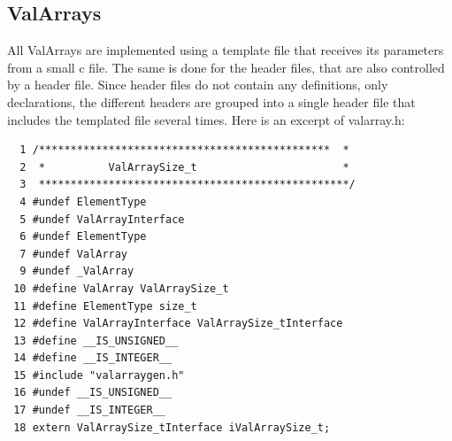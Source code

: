 \documentclass[12pt,a4paper,openany]{memoir} %
\begin{document}
{{\subsection{ValArrays}
All ValArrays are implemented using a template file that receives its parameters from a small c file. The same is done for the header files, that
are also controlled by a header file. Since header files do not contain any definitions, only declarations, the different headers are grouped into
a single header file that includes the templated file several times. Here is an excerpt of valarray.h:
\begin{verbatim}
  1 /**********************************************  *       
  2  *          ValArraySize_t                       *
  3  *************************************************/ 
  4 #undef ElementType
  5 #undef ValArrayInterface
  6 #undef ElementType
  7 #undef ValArray
  9 #undef _ValArray
 10 #define ValArray ValArraySize_t
 11 #define ElementType size_t
 12 #define ValArrayInterface ValArraySize_tInterface
 13 #define __IS_UNSIGNED__
 14 #define __IS_INTEGER__
 15 #include "valarraygen.h"
 16 #undef __IS_UNSIGNED__
 17 #undef __IS_INTEGER__
 18 extern ValArraySize_tInterface iValArraySize_t;
 

\end{verbatim}}}
\end{document}
